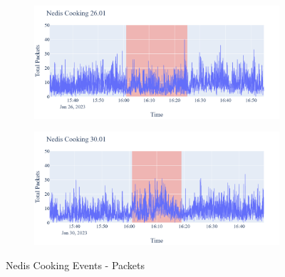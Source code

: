 \begin{figure}[H]
    \begin{subfigure}[b]{0.47\textwidth}
        \centering
        \includegraphics[width=1.2\hsize]{figures/Nedis_Cooking_Packets_26.01.png}
    \end{subfigure}
    \hspace{0.6cm}
    \begin{subfigure}[b]{0.47\textwidth}
        \centering
        \includegraphics[width=1.2\hsize]{figures/Nedis_Cooking_Packets_30.01.png}
    \end{subfigure}
    \caption{Nedis Cooking Events - Packets}
    \label{fig:NedisCookingPackets}
\end{figure}

